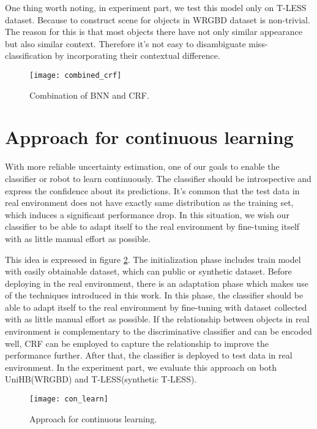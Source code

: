  One thing worth noting, in experiment part, we test this model only on T-LESS dataset. Because to construct scene for objects in WRGBD dataset is non-trivial. The reason for this is that most objects there have not only similar appearance but also similar context. Therefore it's not easy to disambiguate miss-classification by incorporating their contextual difference.
\begin{figure}[H]
	\begin{center}
		\texttt{[image: combined\_crf]}
		\caption{Combination of BNN and CRF.}		
		\label{fig:combined_crf}
	\end{center}
\end{figure}
\section{Approach for continuous learning}
With more reliable uncertainty estimation, one of our goals to enable the classifier or robot to learn continuously. The classifier should be introspective and express the confidence about its predictions. It's common that the test data in real environment does not have exactly same distribution as the training set, which induces a significant performance drop. In this situation, we wish our classifier to be able to adapt itself to the real environment by fine-tuning itself with as little manual effort as possible. 

This idea is expressed in figure \ref{fig:con_learn}. The initialization phase includes train model with easily obtainable dataset, which can public or synthetic dataset. Before deploying in the real environment, there is an adaptation phase which makes use of the techniques introduced in this work. In this phase, the classifier should be able to adapt itself to the real environment by fine-tuning with dataset collected with as little manual effort as possible. If the relationship between objects in real environment is complementary to the discriminative classifier and can be encoded well, CRF can be employed to capture the relationship to improve the performance further. After that, the classifier is deployed to test data in real environment. In the experiment part, we evaluate this approach on both UniHB(WRGBD) and T-LESS(synthetic T-LESS).
\begin{figure}[H]
	\begin{center}
		\texttt{[image: con\_learn]}
		\caption{Approach for continuous learning.}		
		\label{fig:con_learn}
	\end{center}
\end{figure}
